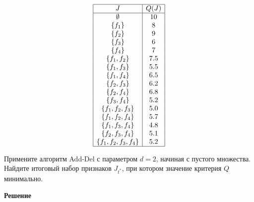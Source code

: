 \[
\begin{array}{|c|c|}
\hline
J & Q(J) \\
\hline
\emptyset & 10 \\
\{f_1\} & 8 \\
\{f_2\} & 9 \\
\{f_3\} & 6 \\
\{f_4\} & 7 \\
\{f_1, f_2\} & 7.5 \\
\{f_1, f_3\} & 5.5 \\
\{f_1, f_4\} & 6.5 \\
\{f_2, f_3\} & 6.2 \\
\{f_2, f_4\} & 6.8 \\
\{f_3, f_4\} & 5.2 \\
\{f_1, f_2, f_3\} & 5.0 \\
\{f_1, f_2, f_4\} & 5.7 \\
\{f_1, f_3, f_4\} & 4.8 \\
\{f_2, f_3, f_4\} & 5.1 \\
\{f_1, f_2, f_3, f_4\} & 5.2 \\
\hline
\end{array}
\]

Примените алгоритм Add-Del с параметром \( d = 2 \), начиная с пустого множества. Найдите итоговый набор признаков \( J_{t^*} \), при котором значение критерия \( Q \) минимально.

\bigskip

\textbf{Решение}



